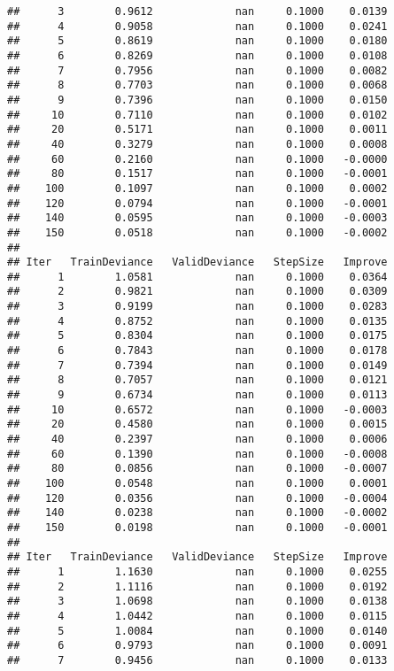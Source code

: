 \documentclass[]{article}
\begin{document}
\begin{verbatim}
##      3        0.9612             nan     0.1000    0.0139
##      4        0.9058             nan     0.1000    0.0241
##      5        0.8619             nan     0.1000    0.0180
##      6        0.8269             nan     0.1000    0.0108
##      7        0.7956             nan     0.1000    0.0082
##      8        0.7703             nan     0.1000    0.0068
##      9        0.7396             nan     0.1000    0.0150
##     10        0.7110             nan     0.1000    0.0102
##     20        0.5171             nan     0.1000    0.0011
##     40        0.3279             nan     0.1000    0.0008
##     60        0.2160             nan     0.1000   -0.0000
##     80        0.1517             nan     0.1000   -0.0001
##    100        0.1097             nan     0.1000    0.0002
##    120        0.0794             nan     0.1000   -0.0001
##    140        0.0595             nan     0.1000   -0.0003
##    150        0.0518             nan     0.1000   -0.0002
## 
## Iter   TrainDeviance   ValidDeviance   StepSize   Improve
##      1        1.0581             nan     0.1000    0.0364
##      2        0.9821             nan     0.1000    0.0309
##      3        0.9199             nan     0.1000    0.0283
##      4        0.8752             nan     0.1000    0.0135
##      5        0.8304             nan     0.1000    0.0175
##      6        0.7843             nan     0.1000    0.0178
##      7        0.7394             nan     0.1000    0.0149
##      8        0.7057             nan     0.1000    0.0121
##      9        0.6734             nan     0.1000    0.0113
##     10        0.6572             nan     0.1000   -0.0003
##     20        0.4580             nan     0.1000    0.0015
##     40        0.2397             nan     0.1000    0.0006
##     60        0.1390             nan     0.1000   -0.0008
##     80        0.0856             nan     0.1000   -0.0007
##    100        0.0548             nan     0.1000    0.0001
##    120        0.0356             nan     0.1000   -0.0004
##    140        0.0238             nan     0.1000   -0.0002
##    150        0.0198             nan     0.1000   -0.0001
## 
## Iter   TrainDeviance   ValidDeviance   StepSize   Improve
##      1        1.1630             nan     0.1000    0.0255
##      2        1.1116             nan     0.1000    0.0192
##      3        1.0698             nan     0.1000    0.0138
##      4        1.0442             nan     0.1000    0.0115
##      5        1.0084             nan     0.1000    0.0140
##      6        0.9793             nan     0.1000    0.0091
##      7        0.9456             nan     0.1000    0.0133

\end{verbatim}
\end{document}
